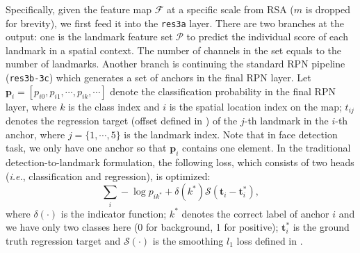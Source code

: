 \documentclass[10pt,twocolumn,letterpaper]{article}
\begin{document}
Specifically,
given the feature map $\mathcal{F}$ at a specific scale from RSA ($m$ is dropped for brevity), we first feed it into the \texttt{res3a} layer. There are two branches at the output: %
one is the landmark feature set $\mathcal{P}$ to predict the individual score of each landmark in a spatial context. The number of channels in the set equals to the number of landmarks. Another branch is continuing the standard RPN \cite{faster_rcnn} pipeline (\texttt{res3b-3c}) which generates a set of anchors in the final RPN layer.
%
%
Let $\bm{p}_i = [p_{i0}, p_{i1}, \cdots, p_{ik}, \cdots]$ denote the classification probability in the final RPN layer, where $k$ is the class index and $i$ is the spatial location index on the map; $t_{ij}$ denotes the regression target (offset defined in \cite{fast_rcnn}) of the $j$-th landmark in the $i$-th anchor, where $j=\{1, \cdots, 5\}$ is the landmark index. Note that in face detection task, we only have one anchor so that $\bm{p}_i$  contains one element.
%
In the traditional detection-to-landmark formulation, the following loss, which consists of two heads (\textit{i.e.}, classification and regression), is optimized:
\begin{equation}
\sum_i -\log p_{i k^*}+ \delta(k^*)  \mathcal{S}(\bm{t}_{i} - \bm{t}_{i}^*), \nonumber
\end{equation}
where $\delta(\cdot)$ is the indicator function; $k^*$ denotes the correct label of anchor $i$ and we have only two classes here (0 for background, 1 for positive); $\bm{t}_{i}^*$ is the ground truth regression target and $\mathcal{S}(\cdot)$ is the smoothing $l_1$ loss defined in \cite{fast_rcnn}.
\end{document}
